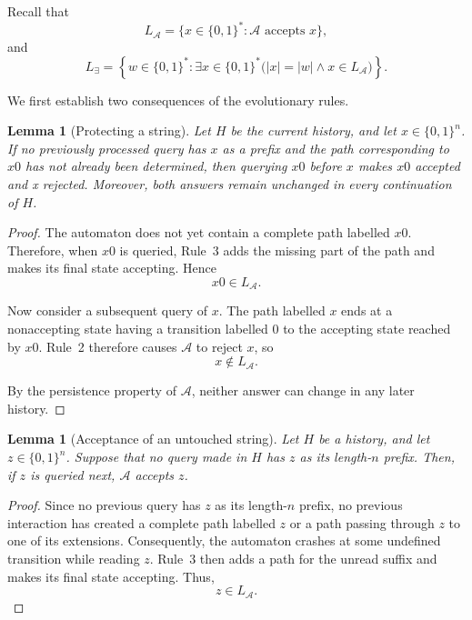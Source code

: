 \documentclass[11pt]{article}
\newtheorem{lemma}[definition]{Lemma}
\begin{document}
Recall that
\[
L_{\mathcal A}
=
\{x\in\{0,1\}^* :
\mathcal A \text{ accepts }x\},
\]
and
\[
L_{\exists}
=
\left\{
w\in\{0,1\}^* :
\exists x\in\{0,1\}^*
\bigl(
|x|=|w|
\land
x\in L_{\mathcal A}
\bigr)
\right\}.
\]

We first establish two consequences of the evolutionary rules.

\begin{lemma}[Protecting a string]
\label{lem:protect-string}
Let \(H\) be the current history, and let
\(x\in\{0,1\}^n\). If no previously processed query has \(x\) as a prefix and the path corresponding to \(x0\) has not already been determined, then querying \(x0\) before \(x\) makes \(x0\) accepted and x rejected. 
Moreover, both answers remain unchanged in every continuation of \(H\).
\end{lemma}

\begin{proof}
The automaton does not yet contain a complete path labelled
\(x0\). Therefore, when \(x0\) is queried, Rule~3 adds the missing
part of the path and makes its final state accepting. Hence
\[
x0\in L_{\mathcal A}.
\]

Now consider a subsequent query of \(x\). The path labelled \(x\)
ends at a nonaccepting state having a transition labelled \(0\) to
the accepting state reached by \(x0\). Rule~2 therefore causes
\(\mathcal A\) to reject \(x\), so
\[
x\notin L_{\mathcal A}.
\]

By the persistence property of \(\mathcal A\), neither answer can
change in any later history.
\end{proof}

\begin{lemma}[Acceptance of an untouched string]
\label{lem:untouched-string}
Let \(H\) be a history, and let \(z\in\{0,1\}^n\). Suppose that no
query made in \(H\) has \(z\) as its length-\(n\) prefix. Then,
if \(z\) is queried next, \(\mathcal A\) accepts \(z\).
\end{lemma}

\begin{proof}
Since no previous query has \(z\) as its length-\(n\) prefix, no
previous interaction has created a complete path labelled \(z\) or
a path passing through \(z\) to one of its extensions. Consequently,
the automaton crashes at some undefined transition while reading
\(z\). Rule~3 then adds a path for the unread suffix and makes its
final state accepting. Thus,
\[
z\in L_{\mathcal A}.
\]
\end{proof}
\end{document}
